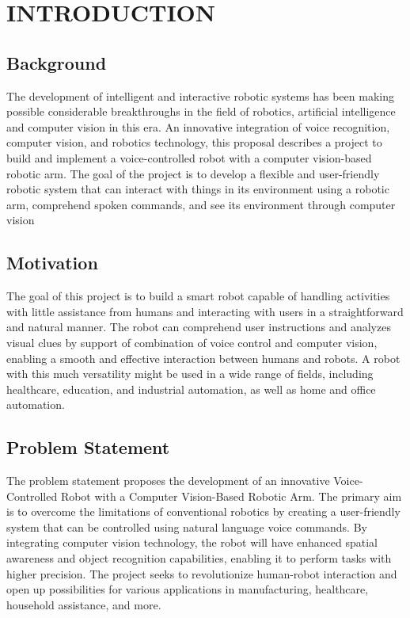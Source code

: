 \chapter{INTRODUCTION}
\section{Background}
The development of intelligent and interactive robotic systems has been making possible considerable breakthroughs in the field of robotics, artificial intelligence and computer vision in this era. An innovative integration of voice recognition, computer vision, and robotics technology, this proposal describes a project to build and implement a voice-controlled robot with a computer vision-based robotic arm. The goal of the project is to develop a flexible and user-friendly robotic system that can interact 
with things in its environment using a robotic arm, comprehend spoken commands, and see its environment through computer vision

\section{Motivation}
The goal of this project is to build a smart robot capable of handling activities with little assistance from humans and interacting with users in a straightforward and natural 
manner. The robot can comprehend user instructions and analyzes visual clues by support of combination of voice control and computer vision, enabling a smooth and effective interaction between humans and robots. A robot with this much versatility might be used in a wide range of fields, including healthcare, education, and industrial automation, as well as home and office automation.

\section{Problem Statement}
The problem statement proposes the development of an innovative Voice-Controlled Robot with a Computer Vision-Based Robotic Arm. The primary aim is to overcome the limitations of conventional robotics by creating a user-friendly system that can be controlled using natural language voice commands. By integrating computer vision 
technology, the robot will have enhanced spatial awareness and object recognition capabilities, enabling it to perform tasks with higher precision. The project seeks to revolutionize human-robot interaction and open up possibilities for various applications 
in manufacturing, healthcare, household assistance, and more.
